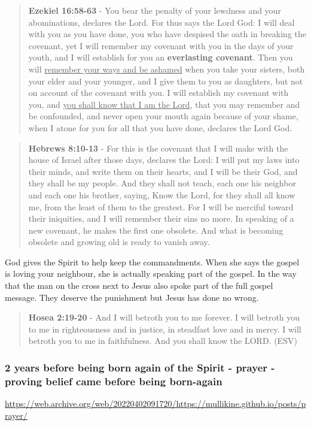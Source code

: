 \documentclass[11pt]{article}
\begin{document}
\begin{quote}
\textbf{Ezekiel 16:58-63} - You bear the penalty of your lewdness and your abominations, declares the Lord.  For thus says the Lord God: I will deal with you as you have done, you who have despised the oath in breaking the covenant, yet I will remember my covenant with you in the days of your youth, and I will establish for you an \textbf{everlasting covenant}.  Then you will \uline{remember your ways and be ashamed} when you take your sisters, both your elder and your younger, and I give them to you as daughters, but not on account of the covenant with you.  I will establish my covenant with you, and \uline{you shall know that I am the Lord}, that you may remember and be confounded, and never open your mouth again because of your shame, when I atone for you for all that you have done, declares the Lord God.
\end{quote}

\begin{quote}
\textbf{Hebrews 8:10-13} - For this is the covenant that I will make with the house of Israel after those days, declares the Lord: I will put my laws into their minds, and write them on their hearts, and I will be their God, and they shall be my people. And they shall not teach, each one his neighbor and each one his brother, saying, Know the Lord, for they shall all know me, from the least of them to the greatest. For I will be merciful toward their iniquities, and I will remember their sins no more. In speaking of a new covenant, he makes the first one obsolete. And what is becoming obsolete and growing old is ready to vanish away.
\end{quote}

God gives the Spirit to help keep the commandments. When she says the gospel is loving your neighbour, she is actually speaking part of the gospel. In the way that the man on the cross next to Jesus also spoke part of the full gospel message. They deserve the punishment but Jesus has done no wrong.

\begin{quote}
\textbf{Hosea 2:19-20} - And I will betroth you to me forever. I will betroth you to me in righteousness and in justice, in steadfast love and in mercy. I will betroth you to me in faithfulness. And you shall know the LORD. (ESV)
\end{quote}

\subsubsection{2 years before being born again of the Spirit - prayer - proving belief came before being born-again}
\label{sec:org31c2a65}
\url{https://web.archive.org/web/20220402091720/https://mullikine.github.io/posts/prayer/}
\end{document}
